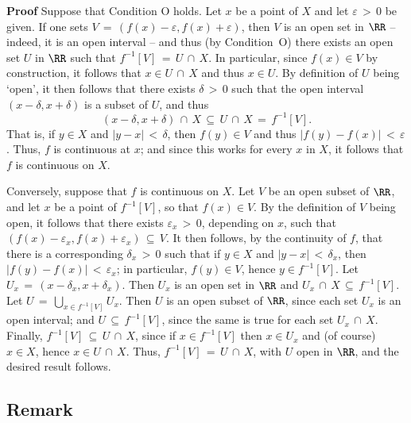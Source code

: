 \V

        {\bf Proof} Suppose that Condition O holds. Let $x$ be a point of $X$ and let ${\varepsilon}\,>\,0$ be given.
    If one sets $V \,=\, (f(x)-{\varepsilon},f(x)+{\varepsilon})$, then $V$ is an open set in ${\RR}$ -- indeed, it is an open interval -- and thus (by Condition~O) there exists an open set $U$ in ${\RR}$ such that $f^{-1}[V] \,=\, U\,{\cap}\,X$.
    In particular, since $f(x){\in}V$ by construction, it follows that $x{\in}U\,{\cap}\,X$ and thus $x{\in}U$.
    By definition of $U$ being `open', it then follows that there exists ${\delta}\,>\,0$ such that the open interval $(x-{\delta},x+{\delta})$ is a subset of $U$,
    and thus
        \begin{displaymath}
        (x-{\delta},x+{\delta})\,{\cap}\,X \,{\subseteq}\, U\,{\cap}\,X \,=\, f^{-1}[V].
        \end{displaymath}
    That is, if $y{\in}X$ and $|y-x|\,<\,{\delta}$, then $f(y){\in}V$ and thus $|f(y)-f(x)|\,<\,{\varepsilon}$.
    Thus, $f$ is continuous at $x$; and since this works for every $x$ in $X$, it follows that $f$ is continuous on $X$.

        Conversely, suppose that $f$ is continuous on $X$. Let $V$ be an open subset of ${\RR}$, and let $x$ be a point of $f^{-1}[V]$, so that $f(x){\in}V$.
    By the definition of $V$ being open, it follows that there exists ${\varepsilon}_{x}\,>\,0$, depending on $x$,
    such that $(f(x)-{\varepsilon}_{x},f(x)+{\varepsilon}_{x}) \,{\subseteq}\, V$.
    It then follows, by the continuity of $f$, that there is a corresponding ${\delta}_{x}\,>\,0$ such that if $y{\in}X$ and $|y-x|\,<\,{\delta}_{x}$,
    then $|f(y)-f(x)|\,<\,{\varepsilon}_{x}$; in particular, $f(y){\in}V$, hence $y{\in}f^{-1}[V]$.
    Let $U_{x} \,=\, (x-{\delta}_{x},x+{\delta}_{x})$. Then $U_{x}$ is an open set in ${\RR}$ and $U_{x}\,{\cap}\,X \,{\subseteq}\, f^{-1}[V]$.
    Let $U \,=\, {\bigcup}_{x{\in}f^{-1}[V]} U_{x}$. Then $U$ is an open subset of ${\RR}$, since each set $U_{x}$ is an open interval;
    and $U \,{\subseteq}\, f^{-1}[V]$, since the same is true for each set $U_{x}\,{\cap}\,X$.
    Finally, $f^{-1}[V] \,{\subseteq}\, U\,{\cap}\,X$, since if $x{\in}f^{-1}[V]$ then $x{\in}U_{x}$ and (of course) $x{\in}X$,
    hence $x{\in}U\,{\cap}\,X$.
    Thus, $f^{-1}[V] \,=\, U\,{\cap}\,X$, with $U$ open in ${\RR}$, and the desired result follows.

\V
\V

             \subsection{\small{\bf Remark}}
            \label{RemrkF30.30}

